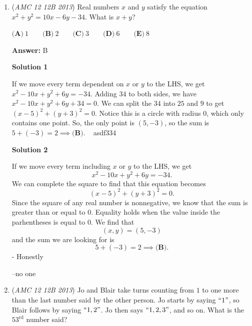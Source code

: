 \begin{enumerate}
 $\textbf{(A)}\ 22 \qquad \textbf{(B)}\ 23.25 \qquad \textbf{(C)}\ 24.75 \qquad \textbf{(D)}\ 26.25 \qquad \textbf{(E)}\ 28$

 \textbf{Answer: }C



\textbf{Solution}

The sum of the ages of the fifth graders is $33 * 11$, while the sum of the ages of the parents is $55 * 33$. Therefore, the total sum of all their ages must be $2178$, and given $33 + 55 = 88$ people in total, their average age is $\frac{2178}{88} = \frac{99}{4} = \boxed{\textbf{(C)}\ 24.75}$.

 


	\item (\textit{AMC 12 12B 2013}) Real numbers $x$ and $y$ satisfy the equation $x^2 + y^2 = 10x - 6y - 34$. What is $x + y$?


 $\textbf{(A)}\ 1 \qquad \textbf{(B)}\ 2 \qquad \textbf{(C)}\ 3 \qquad \textbf{(D)}\ 6 \qquad \textbf{(E)}\ 8$

 \textbf{Answer: }B



\textbf{Solution 1}

If we move every term dependent on $x$ or $y$ to the LHS, we get $x^2 - 10x + y^2 + 6y = -34$. Adding $34$ to both sides, we have $x^2 - 10x + y^2 + 6y + 34 = 0$. We can split the $34$ into $25$ and $9$ to get $(x - 5)^2 + (y + 3)^2 = 0$. Notice this is a circle with radius $0$, which only contains one point. So, the only point is $(5, -3)$, so the sum is $5 + (-3) = 2 \implies \boxed{\textbf{(B)}}$. ~ asdf334

 



\textbf{Solution 2}

If we move every term including $x$ or $y$ to the LHS, we get 
 \[x^2 - 10x + y^2 + 6y = -34.\]  We can complete the square to find that this equation becomes 
 \[(x - 5)^2 + (y + 3)^2 = 0.\]  Since the square of any real number is nonnegative, we know that the sum is greater than or equal to $0$.  Equality holds when the value inside the parhentheses is equal to $0$.  We find that 
 \[(x,y) = (5,-3)\] and the sum we are looking for is 
 \[5+(-3)=2 \implies \boxed{\textbf{(B)}}.\]  - Honestly

 –no one

 


	\item (\textit{AMC 12 12B 2013}) Jo and Blair take turns counting from $1$ to one more than the last number said by the other person. Jo starts by saying $``1"$, so Blair follows by saying $``1, 2"$. Jo then says $``1, 2, 3"$, and so on. What is the $53^{\text{rd}}$ number said?



\end{enumerate}
